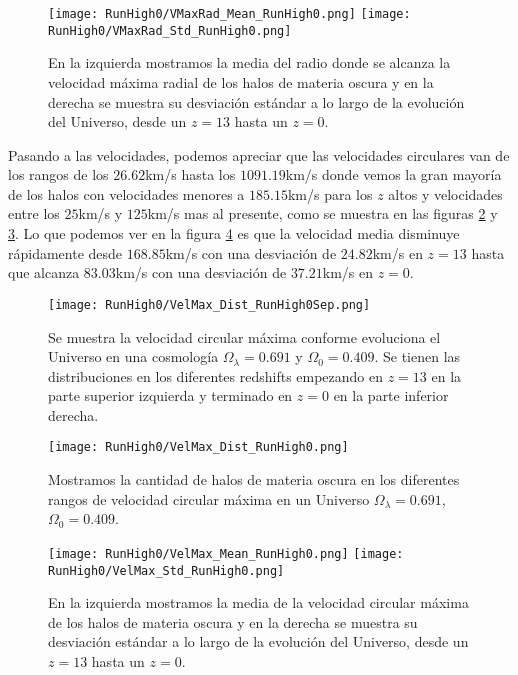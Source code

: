 \begin{figure}[H]
    \centering
    \texttt{[image: RunHigh0/VMaxRad\_Mean\_RunHigh0.png]}
    \texttt{[image: RunHigh0/VMaxRad\_Std\_RunHigh0.png]}
    \caption[Media y desviación estándar del Radio donde se alcanza la velocidad máxima radial]{\footnotesize En la izquierda mostramos la media del radio donde se alcanza la velocidad máxima radial de los halos de materia oscura y en la derecha se muestra su desviación estándar a lo largo de la evolución del Universo, desde un $z=13$ hasta un $z=0$.}
    \label{fig:High0-VMaxRadStats}
\end{figure}

Pasando a las velocidades, podemos apreciar que las velocidades circulares van de los rangos de los $26.62$km/s hasta los $1091.19$km/s donde vemos la gran mayoría de los halos con velocidades menores a $185.15$km/s para los $z$ altos y  velocidades entre los $25$km/s y $125$km/s mas al presente, como se muestra en las figuras \ref{fig:High0-VelMaxDistSep} y \ref{fig:High0-VelMaxDist}. Lo que podemos ver en la figura \ref{fig:High0-VelMaxStats} es que la velocidad media disminuye rápidamente desde $168.85$km/s con una desviación de $24.82$km/s en $z=13$ hasta que alcanza $83.03$km/s con una desviación de $37.21$km/s en $z=0$.

\begin{figure}[H]
    \centering
    \texttt{[image: RunHigh0/VelMax\_Dist\_RunHigh0Sep.png]}
    \caption[Velocidad circular máxima]{\footnotesize Se muestra la velocidad circular máxima conforme evoluciona el Universo en una cosmología $\Omega_\lambda = 0.691$ y $\Omega_0 = 0.409$. Se tienen las distribuciones en los diferentes redshifts empezando en $z=13$ en la parte superior izquierda y terminado en $z=0$ en la parte inferior derecha.}
    \label{fig:High0-VelMaxDistSep}
\end{figure}

\begin{figure}[H]
    \centering
    \texttt{[image: RunHigh0/VelMax\_Dist\_RunHigh0.png]}
    \caption[Distribución de la velocidad circular máxima]{\footnotesize Mostramos la cantidad de halos de materia oscura en los diferentes rangos de velocidad circular máxima en un Universo $\Omega_\lambda = 0.691$, $\Omega_0 = 0.409$.}
    \label{fig:High0-VelMaxDist}
\end{figure}

\begin{figure}[H]
    \centering
    \texttt{[image: RunHigh0/VelMax\_Mean\_RunHigh0.png]}
    \texttt{[image: RunHigh0/VelMax\_Std\_RunHigh0.png]}
    \caption[Media y desviación estándar de la velocidad circular máxima]{\footnotesize En la izquierda mostramos la media de la velocidad circular máxima de los halos de materia oscura y en la derecha se muestra su desviación estándar a lo largo de la evolución del Universo, desde un $z=13$ hasta un $z=0$.}
    \label{fig:High0-VelMaxStats}
\end{figure}

